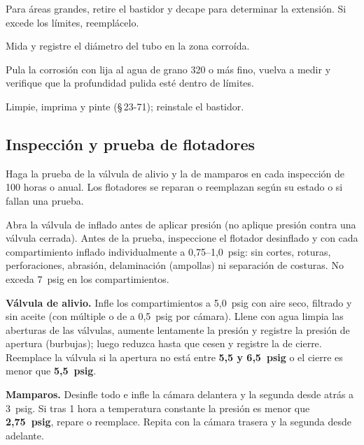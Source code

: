 \begin{pasos}
\item Para áreas grandes, retire el bastidor y decape para determinar la extensión. Si excede los límites, reemplácelo.
\item Mida y registre el diámetro del tubo en la zona corroída.
\item Pula la corrosión con lija al agua de grano 320 o más fino, vuelva a medir y verifique que la profundidad pulida esté dentro de límites.
\item Limpie, imprima y pinte (\S\,23-71); reinstale el bastidor.
\end{pasos}

\begin{checklist}
\end{checklist}

\subsection{Inspección y prueba de flotadores}

Haga la prueba de la válvula de alivio y la de mamparos en cada inspección de 100 horas o anual. Los flotadores se reparan o reemplazan según su estado o si fallan una prueba.

\begin{precaucion}
Abra la válvula de inflado antes de aplicar presión (no aplique presión contra una válvula cerrada). Antes de la prueba, inspeccione el flotador desinflado y con cada compartimiento inflado individualmente a 0,75--1,0~psig: sin cortes, roturas, perforaciones, abrasión, delaminación (ampollas) ni separación de costuras. No exceda 7~psig en los compartimientos.
\end{precaucion}

\textbf{Válvula de alivio.} Infle los compartimientos a 5,0~psig con aire seco, filtrado y sin aceite (con múltiple o de a 0,5~psig por cámara). Llene con agua limpia las aberturas de las válvulas, aumente lentamente la presión y registre la presión de apertura (burbujas); luego reduzca hasta que cesen y registre la de cierre. Reemplace la válvula si la apertura no está entre \textbf{5,5 y 6,5~psig} o el cierre es menor que \textbf{5,5~psig}.

\textbf{Mamparos.} Desinfle todo e infle la cámara delantera y la segunda desde atrás a 3~psig. Si tras 1 hora a temperatura constante la presión es menor que \textbf{2,75~psig}, repare o reemplace. Repita con la cámara trasera y la segunda desde adelante.

